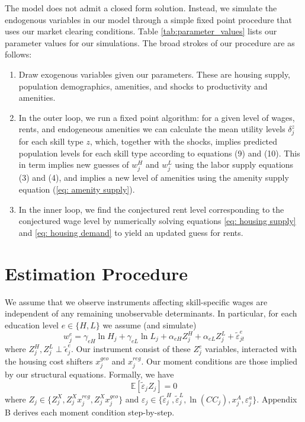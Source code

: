 \documentclass{article}
\begin{document}
The model does not admit a closed form solution. Instead, we simulate the endogenous variables in our model through a simple fixed point procedure that uses our market clearing conditions. Table \ref{tab:parameter_values} lists our parameter values for our simulations. The broad strokes of our procedure are as follows: 
\begin{enumerate}
\item Draw exogenous variables given our parameters. These are housing supply, population demographics, amenities, and shocks to productivity and amenities. 
\item In the outer loop, we run a fixed point algorithm: for a given level of wages,  rents, and endogeneous amenities we can calculate the mean utility levels $\delta^z_{j}$ for each skill type $z$, which, together with the shocks, implies predicted population levels for each skill type according to equations (9) and (10). This in term implies new guesses of $w^H_{j}$ and $w^L_{j}$ using the labor supply equations (3) and (4), and implies a new level of amenities using the amenity supply equation (\ref{eq: amenity supply}).

\item In the inner loop, we find the conjectured rent level corresponding to the conjectured wage level by numerically solving equations \ref{eq: housing supply} and \ref{eq: housing demand} to yield an updated guess for rents. 
\end{enumerate}



\section{Estimation Procedure}
We assume that we observe instruments affecting skill-specific wages are independent of any remaining unobservable determinants. In particular, for each education level $e\in \{H,L\} $ we assume (and simulate)
 $$ w_{j}^e = \gamma_{eH}  \ln H_{j} + \gamma_{eL} \ln L_{j}+\alpha_{eH} Z_{j}^H  + \alpha_{eL} Z_{j}^L + \tilde{\varepsilon}_{jt}^e
 $$
where $Z_j^H,Z_j^L \perp \tilde{\epsilon}_j^e$. Our instrument consist of these $Z^e_j$ variables, interacted with the housing cost shifters $x_j^{geo}$ and $x_j^{reg}$. Our moment conditions are those implied by our structural equations. Formally, we have
$$\mathbb{E}[\tilde\varepsilon_j  Z_j]=0$$ 
where $Z_j \in \{ Z^X_{j},  Z_{j}^X x_j^{reg},  Z_{j}^X x_j^{geo}\}$  and $\varepsilon_j \in \{ \tilde\varepsilon_j^H, \tilde\varepsilon_j^L, \ln (CC_j), x_j^A, \varepsilon_j^a\}$. Appendix B derives each moment condition step-by-step. 
\end{document}
